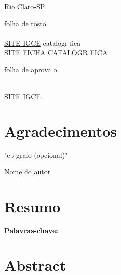 \documentclass{article}
\begin{document}
\begin{titlepage}
	\begin{center}
		\vfill{}
		\vfill{}
		\par\end{center}
	
	\begin{center}
		Rio Claro-SP
		
		\ano
		\par\end{center}
	
\end{titlepage}
\newpage
folha de rosto \\
\textbf{\color{red}{Trocar pelos anexos da pagina da biblioteca}} \\
\href{https://igce.rc.unesp.br/index.php#!/instituicao/diretoria-tecnica-academica/graduacao/tcc/normas-fisica/}{SITE IGCE}
\newpage
catalogr fica
\textbf{\color{red}{Trocar pela ficha catalogr fica dispon vel na pagina da biblioteca}} \\
\href{https://www.biblioteca.unesp.br/ficha/}{SITE FICHA CATALOGR FICA }

\newpage
folha de aprova o


\textbf{\color{red}{Trocar pelos anexos da pagina da biblioteca}}\\ 
\href{https://igce.rc.unesp.br/index.php#!/instituicao/diretoria-tecnica-academica/graduacao/tcc/normas-fisica/}{SITE IGCE}






\thispagestyle{empty}



\section*{Agradecimentos}

\newpage
\thispagestyle{empty}

\phantom{a}
\vspace{30\baselineskip}

\epigraph{"ep grafo (opcional)"}{Nome do autor}

\newpage
\thispagestyle{empty}
\section*{Resumo}

\textbf{Palavras-chave:}


\section*{Abstract}
\end{document}

